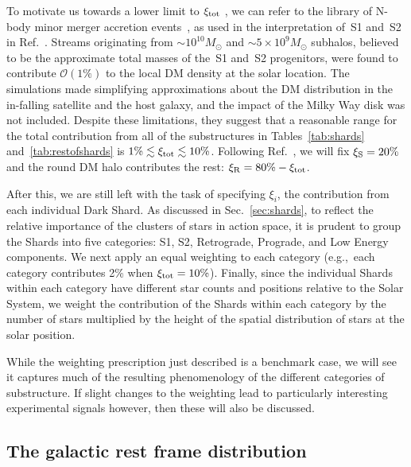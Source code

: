 \documentclass[prd,10pt,twocolumn,showpacs,nofootinbib,aps,superscriptaddress,preprintnumbers]{revtex4-1}
\begin{document}
  To motivate us towards a lower limit to $\xi_{\rm tot}$ , we can refer
  to the library of N-body minor merger accretion
  events~\cite{Amorisco:2017}, as used in the interpretation of~S1
  and~S2 in Ref.~\cite{Myeong:2017skt}. Streams originating from
  $\sim10^{10}M_\odot$ and $\sim5\times10^9 M_\odot$ subhalos,
  believed to be the approximate total masses of the~S1 and~S2 progenitors,
  were found to contribute $\mathcal{O}(1\%)$ to the local DM density at
  the solar location. The simulations made simplifying approximations
  about the DM distribution in the in-falling satellite and the host
  galaxy, and the impact of the Milky Way disk was not included.
  Despite these limitations, they suggest that a reasonable range for
  the total contribution from all of the substructures in
  Tables~\ref{tab:shards} and~\ref{tab:restofshards} is $1\% \lesssim
  \xi_{\rm tot} \lesssim 10\%$. Following Ref.~\cite{Evans:2018bqy}, we
  will fix $\xi_{\rm{S}}=20\%$ and the round DM halo contributes the
  rest: $\xi_{\rm{R}}=80\%-\xi_{\rm tot}$.

  After this, we are still left with the task of
  specifying $\xi_i$, the contribution from each individual Dark Shard.
  As discussed in Sec.~\ref{sec:shards}, to reflect the relative
  importance of the clusters of stars in action space, it is prudent to
  group the Shards into five categories: S1, S2, Retrograde, Prograde,
  and Low Energy components.  We next apply an equal weighting to each
  category (e.g.,\ each category contributes 2\% when $\xi_{\rm tot} =
  10\%$).  Finally, since the individual Shards within each category
  have different star counts and positions relative to the Solar System,
  we weight the contribution of the Shards within each category by the
  number of stars multiplied by the height of the spatial distribution
  of stars at the solar position.  

While the weighting prescription just described is a benchmark
case, we will see it captures much of the resulting 
phenomenology of the different categories of substructure. 
If slight changes to the weighting lead to particularly
interesting experimental signals however, then these will also be discussed.

  \subsection{The galactic rest frame distribution}
\end{document}
